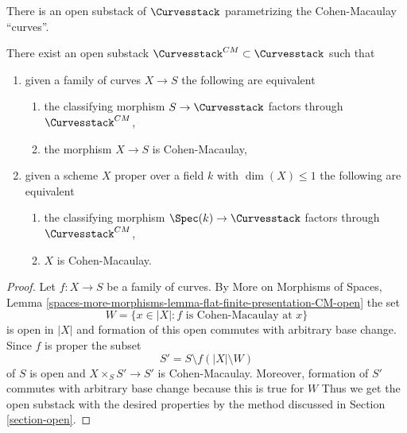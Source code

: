 \noindent
There is an open substack of $\Curvesstack$ parametrizing
the Cohen-Macaulay ``curves''.

\begin{lemma}
\label{lemma-CM-curves}
There exist an open substack $\Curvesstack^{CM} \subset \Curvesstack$
such that
\begin{enumerate}
\item given a family of curves $X \to S$ the following are equivalent
\begin{enumerate}
\item the classifying morphism $S \to \Curvesstack$ factors
through $\Curvesstack^{CM}$,
\item the morphism $X \to S$ is Cohen-Macaulay,
\end{enumerate}
\item given a scheme $X$ proper over a field $k$ with $\dim(X) \leq 1$
the following are equivalent
\begin{enumerate}
\item the classifying morphism $\Spec(k) \to \Curvesstack$ factors
through $\Curvesstack^{CM}$,
\item $X$ is Cohen-Macaulay.
\end{enumerate}
\end{enumerate}
\end{lemma}

\begin{proof}
Let $f : X \to S$ be a family of curves. By
More on Morphisms of Spaces, Lemma
\ref{spaces-more-morphisms-lemma-flat-finite-presentation-CM-open}
the set
$$
W = \{x \in |X| : f \text{ is Cohen-Macaulay at }x\}
$$
is open in $|X|$ and formation of this open commutes with arbitrary
base change. Since $f$ is proper the subset
$$
S' = S \setminus f(|X| \setminus W)
$$
of $S$ is open and $X \times_S S' \to S'$ is Cohen-Macaulay.
Moreover, formation of $S'$ commutes with arbitrary base
change because this is true for $W$
Thus we get the open substack with the desired properties
by the method discussed in Section \ref{section-open}.
\end{proof}

